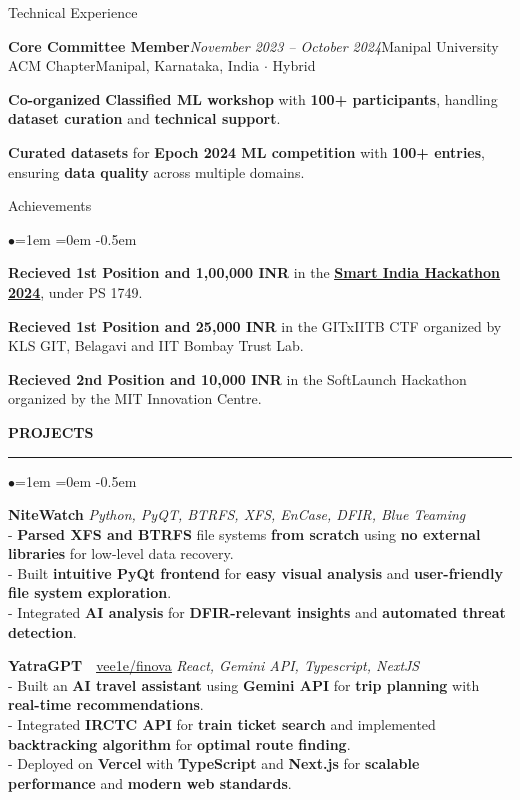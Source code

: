 \documentclass{resume} %
\begin{document}
\begin{rSection}{Technical Experience}
\begin{rSubsection}{\bf Core Committee Member}{\em November 2023 -- October 2024}{Manipal University ACM Chapter}{Manipal, Karnataka, India $\cdot$ Hybrid}
\item \textbf{Co-organized} \textbf{Classified ML workshop} with \textbf{100+ participants}, handling \textbf{dataset curation} and \textbf{technical support}.
\item \textbf{Curated datasets} for \textbf{Epoch 2024 ML competition} with \textbf{100+ entries}, ensuring \textbf{data quality} across multiple domains.
\end{rSubsection}

\end{rSection}

\begin{rSection}{Achievements}
\begin{list}{$\bullet$}{\leftmargin=1em \itemindent=0em}
\itemsep -0.5em
\item \textbf{Recieved 1st Position and 1,00,000 INR} in the \href{https://www.sih.gov.in/sih2024/sih2024-grand-finale-result}{\textbf{\underline{Smart India Hackathon 2024}}}, under PS 1749.
\item \textbf{Recieved 1st Position and 25,000 INR} in the GITxIITB CTF organized by KLS GIT, Belagavi and IIT Bombay Trust Lab.
\item \textbf{Recieved 2nd Position and 10,000 INR} in the SoftLaunch Hackathon organized by the MIT Innovation Centre.
\end{list}
\end{rSection}

\MakeUppercase{\textbf{Projects}}
\medskip
\hrule
\begin{list}{$\bullet$}{\leftmargin=1em \itemindent=0em}
\itemsep -0.5em
\item {\bf NiteWatch} \hfill {\em Python, PyQT, BTRFS, XFS, EnCase, DFIR, Blue Teaming} \\
- \textbf{Parsed XFS and BTRFS} file systems \textbf{from scratch} using \textbf{no external libraries} for low-level data recovery. \\
- Built \textbf{intuitive PyQt frontend} for \textbf{easy visual analysis} and \textbf{user-friendly file system exploration}. \\
- Integrated \textbf{AI analysis} for \textbf{DFIR-relevant insights} and \textbf{automated threat detection}.
\item {\bf YatraGPT}~\faGithub~\href{https://github.com/vee1e/finova}{\underline{vee1e/finova}} \hfill {\em React, Gemini API, Typescript, NextJS} \\
- Built an \textbf{AI travel assistant} using \textbf{Gemini API} for \textbf{trip planning} with \textbf{real-time recommendations}. \\
- Integrated \textbf{IRCTC API} for \textbf{train ticket search} and implemented \textbf{backtracking algorithm} for \textbf{optimal route finding}. \\
- Deployed on \textbf{Vercel} with \textbf{TypeScript} and \textbf{Next.js} for \textbf{scalable performance} and \textbf{modern web standards}.
\end{list}
\vspace{0.5em}
\end{document}
